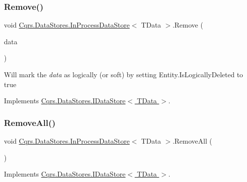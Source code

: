 \subsubsection{\texorpdfstring{Remove()}{Remove()}}
{\footnotesize\ttfamily void \hyperlink{classCqrs_1_1DataStores_1_1InProcessDataStore}{Cqrs.\+Data\+Stores.\+In\+Process\+Data\+Store}$<$ T\+Data $>$.Remove (\begin{DoxyParamCaption}\item[{T\+Data}]{data }\end{DoxyParamCaption})}



Will mark the {\itshape data}  as logically (or soft) by setting Entity.\+Is\+Logically\+Deleted to true 



Implements \hyperlink{interfaceCqrs_1_1DataStores_1_1IDataStore_a7ef540796bbe4257296841590bc23478_a7ef540796bbe4257296841590bc23478}{Cqrs.\+Data\+Stores.\+I\+Data\+Store$<$ T\+Data $>$}.

\mbox{\label{classCqrs_1_1DataStores_1_1InProcessDataStore_acd350f7abef7311064434ae31a50755b_acd350f7abef7311064434ae31a50755b}} 
\subsubsection{\texorpdfstring{Remove\+All()}{RemoveAll()}}
{\footnotesize\ttfamily void \hyperlink{classCqrs_1_1DataStores_1_1InProcessDataStore}{Cqrs.\+Data\+Stores.\+In\+Process\+Data\+Store}$<$ T\+Data $>$.Remove\+All (\begin{DoxyParamCaption}{ }\end{DoxyParamCaption})}



Implements \hyperlink{interfaceCqrs_1_1DataStores_1_1IDataStore_aead8d7a39a717d29af05daf7b64bea94_aead8d7a39a717d29af05daf7b64bea94}{Cqrs.\+Data\+Stores.\+I\+Data\+Store$<$ T\+Data $>$}.

\mbox{\label{classCqrs_1_1DataStores_1_1InProcessDataStore_af70e6f6e5aabc24ee12ef3d2bcd3bf60_af70e6f6e5aabc24ee12ef3d2bcd3bf60}} 
